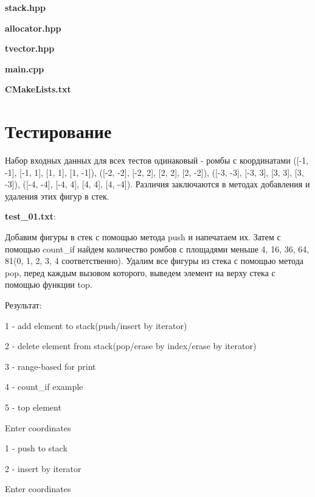 \documentclass[a4paper, 12pt]{article}
\begin{document}
\vspace{3ex}
\textbf{\large{stack.hpp}}


\vspace{3ex}
\textbf{\large{allocator.hpp}}


\vspace{3ex}
\textbf{\large{tvector.hpp}}


\vspace{3ex}
\textbf{\large{main.cpp}}


\vspace{3ex}
\textbf{\large{CMakeLists.txt}}


%
\newpage
\section{Тестирование}
\vspace{3ex}

Набор входных данных для всех тестов одинаковый - ромбы с координатами ([-1, -1], [-1, 1], [1, 1],
[1, -1]), ([-2, -2], [-2, 2], [2, 2], [2, -2]), ([-3, -3], [-3, 3], [3, 3], [3, -3]),
([-4, -4], [-4, 4], [4, 4], [4, -4]). Различия заключаются в методах добавления и удаления этих фигур в стек.

\textbf{test\_01.txt}:

Добавим фигуры в стек с помощью метода push и напечатаем их. Затем с помощью count\_if найдем количество ромбов с площадями меньше 4, 16, 36, 64, 81(0, 1, 2, 3, 4 соответственно). Удалим все фигуры из стека с помощью метода pop, перед каждым вызовом которого, выведем элемент на верху стека с помощью функции top. 

Результат:

1 - add element to stack(push/insert by iterator)

2 - delete element from stack(pop/erase by index/erase by iterator)

3 - range-based for print

4 - count\_if example

5 - top element

Enter coordinates

1 - push to stack

2 - insert by iterator

Enter coordinates
\end{document}
